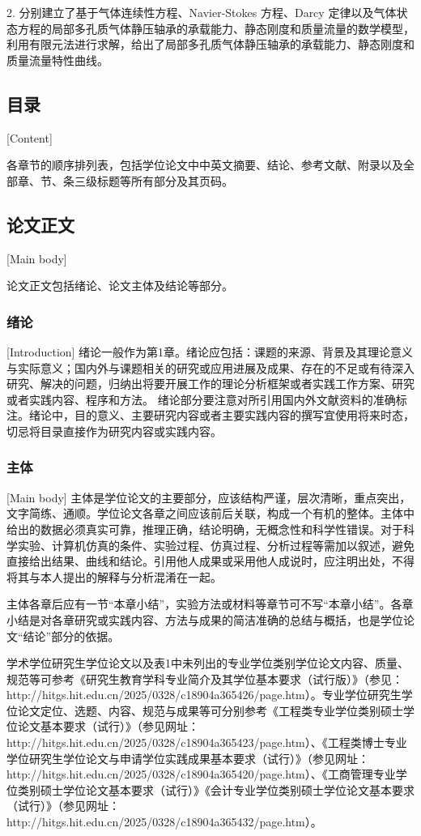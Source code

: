 2. 分别建立了基于气体连续性方程、Navier-Stokes 方程、Darcy 定律以及气体状态方程的局部多孔质气体静压轴承的承载能力、静态刚度和质量流量的数学模型，利用有限元法进行求解，给出了局部多孔质气体静压轴承的承载能力、静态刚度和质量流量特性曲线。





\subsection{目录}[Content]

各章节的顺序排列表，包括学位论文中中英文摘要、结论、参考文献、附录以及全部章、节、条三级标题等所有部分及其页码。

\subsection{论文正文}[Main body]

论文正文包括绪论、论文主体及结论等部分。

\subsubsection{绪论}[Introduction]
绪论一般作为第1章。绪论应包括：课题的来源、背景及其理论意义与实际意义；国内外与课题相关的研究或应用进展及成果、存在的不足或有待深入研究、解决的问题，归纳出将要开展工作的理论分析框架或者实践工作方案、研究或者实践内容、程序和方法。
绪论部分要注意对所引用国内外文献资料的准确标注。绪论中，目的意义、主要研究内容或者主要实践内容的撰写宜使用将来时态，切忌将目录直接作为研究内容或实践内容。


\subsubsection{主体}[Main body]
主体是学位论文的主要部分，应该结构严谨，层次清晰，重点突出，文字简练、通顺。学位论文各章之间应该前后关联，构成一个有机的整体。主体中给出的数据必须真实可靠，推理正确，结论明确，无概念性和科学性错误。对于科学实验、计算机仿真的条件、实验过程、仿真过程、分析过程等需加以叙述，避免直接给出结果、曲线和结论。引用他人成果或采用他人成说时，应注明出处，不得将其与本人提出的解释与分析混淆在一起。

主体各章后应有一节“本章小结”，实验方法或材料等章节可不写“本章小结”。各章小结是对各章研究或实践内容、方法与成果的简洁准确的总结与概括，也是学位论文“结论”部分的依据。

学术学位研究生学位论文以及表1中未列出的专业学位类别学位论文内容、质量、规范等可参考《研究生教育学科专业简介及其学位基本要求（试行版）》（参见：http://hitgs.hit.edu.cn/2025/0328/c18904a365426/page.htm）。专业学位研究生学位论文定位、选题、内容、规范与成果等可分别参考《工程类专业学位类别硕士学位论文基本要求（试行）》（参见网址：http://hitgs.hit.edu.cn/2025/0328/c18904a365423/page.htm）、《工程类博士专业学位研究生学位论文与申请学位实践成果基本要求（试行）》（参见网址：http://hitgs.hit.edu.cn/2025/0328/c18904a365420/page.htm）、《工商管理专业学位类别硕士学位论文基本要求（试行）》《会计专业学位类别硕士学位论文基本要求（试行）》（参见网址：http://hitgs.hit.edu.cn/2025/0328/c18904a365432/page.htm）。


